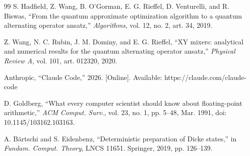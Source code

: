 \documentclass{ieeeaccess}
\begin{document}
\begin{thebibliography}{99}
 S. Hadfield, Z. Wang, B. O'Gorman, E. G. Rieffel, D. Venturelli, and R. Biswas, ``From the quantum approximate optimization algorithm to a quantum alternating operator ansatz,'' \textit{Algorithms}, vol. 12, no. 2, art. 34, 2019.

 Z. Wang, N. C. Rubin, J. M. Dominy, and E. G. Rieffel, ``XY mixers: analytical and numerical results for the quantum alternating operator ansatz,'' \textit{Physical Review A}, vol. 101, art. 012320, 2020.

 Anthropic, ``Claude Code,'' 2026. [Online]. Available: https://claude.com/claude-code

 D. Goldberg, ``What every computer scientist should know about floating-point arithmetic,'' \textit{ACM Comput. Surv.}, vol. 23, no. 1, pp. 5--48, Mar. 1991, doi: 10.1145/103162.103163.

 A. B\"{a}rtschi and S. Eidenbenz, ``Deterministic preparation of Dicke states,'' in \textit{Fundam. Comput. Theory}, LNCS 11651. Springer, 2019, pp. 126--139.\EOD



\end{thebibliography}
\end{document}
